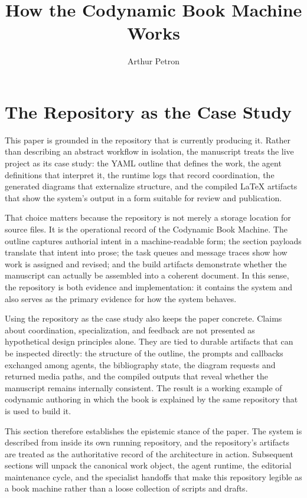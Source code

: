 \documentclass[11pt]{article}
\title{How the Codynamic Book Machine Works}
\author{Arthur Petron}
\begin{document}
\section*{The Repository as the Case Study}

This paper is grounded in the repository that is currently producing it. Rather than describing an abstract workflow in isolation, the manuscript treats the live project as its case study: the YAML outline that defines the work, the agent definitions that interpret it, the runtime logs that record coordination, the generated diagrams that externalize structure, and the compiled \LaTeX{} artifacts that show the system's output in a form suitable for review and publication.

That choice matters because the repository is not merely a storage location for source files. It is the operational record of the Codynamic Book Machine. The outline captures authorial intent in a machine-readable form; the section payloads translate that intent into prose; the task queues and message traces show how work is assigned and revised; and the build artifacts demonstrate whether the manuscript can actually be assembled into a coherent document. In this sense, the repository is both evidence and implementation: it contains the system and also serves as the primary evidence for how the system behaves.

Using the repository as the case study also keeps the paper concrete. Claims about coordination, specialization, and feedback are not presented as hypothetical design principles alone. They are tied to durable artifacts that can be inspected directly: the structure of the outline, the prompts and callbacks exchanged among agents, the bibliography state, the diagram requests and returned media paths, and the compiled outputs that reveal whether the manuscript remains internally consistent. The result is a working example of codynamic authoring in which the book is explained by the same repository that is used to build it.

This section therefore establishes the epistemic stance of the paper. The system is described from inside its own running repository, and the repository's artifacts are treated as the authoritative record of the architecture in action. Subsequent sections will unpack the canonical work object, the agent runtime, the editorial maintenance cycle, and the specialist handoffs that make this repository legible as a book machine rather than a loose collection of scripts and drafts.
\end{document}
